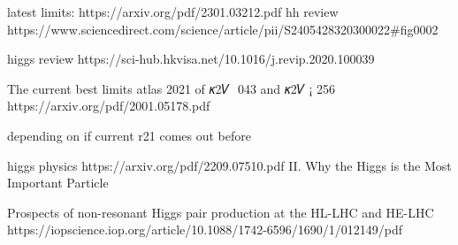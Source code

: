 latest limits: https://arxiv.org/pdf/2301.03212.pdf 
hh review 
https://www.sciencedirect.com/science/article/pii/S2405428320300022#fig0002

higgs review
https://sci-hub.hkvisa.net/10.1016/j.revip.2020.100039

The current best limits 
atlas 2021 
of 𝜅2𝑉  043 and 𝜅2𝑉 ¡ 256
https://arxiv.org/pdf/2001.05178.pdf 

depending on if current r21 comes out before
    

higgs physics
https://arxiv.org/pdf/2209.07510.pdf 
II. Why the Higgs is the Most Important Particle



Prospects of non-resonant Higgs pair production
at the HL-LHC and HE-LHC
https://iopscience.iop.org/article/10.1088/1742-6596/1690/1/012149/pdf
